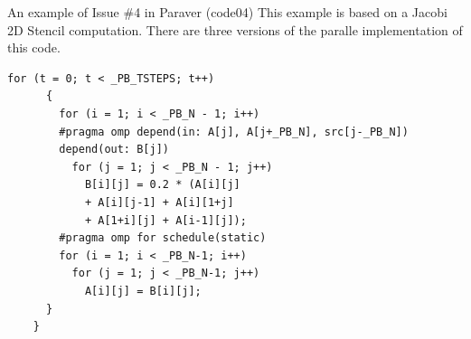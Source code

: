 \documentclass[10pt,xcolor=table]{beamer}
\begin{document}
\begin{frame}[fragile]{An example of Issue \#4 in Paraver (code04)}
This example is based on a Jacobi 2D Stencil computation. There are three versions of the paralle implementation of this code. 
  \begin{lstlisting}[style=shell,gobble=3,basicstyle=\scriptsize\ttfamily,caption={Parallelized with tasks (v1)}]
      for (t = 0; t < _PB_TSTEPS; t++)
      {
        for (i = 1; i < _PB_N - 1; i++)
        #pragma omp depend(in: A[j], A[j+_PB_N], src[j-_PB_N]) 
        depend(out: B[j])   
          for (j = 1; j < _PB_N - 1; j++)
            B[i][j] = 0.2 * (A[i][j] 
            + A[i][j-1] + A[i][1+j] 
            + A[1+i][j] + A[i-1][j]);
        #pragma omp for schedule(static) 
        for (i = 1; i < _PB_N-1; i++)
          for (j = 1; j < _PB_N-1; j++)
            A[i][j] = B[i][j];
      }
    }
  \end{lstlisting}
\end{frame}
\end{document}
